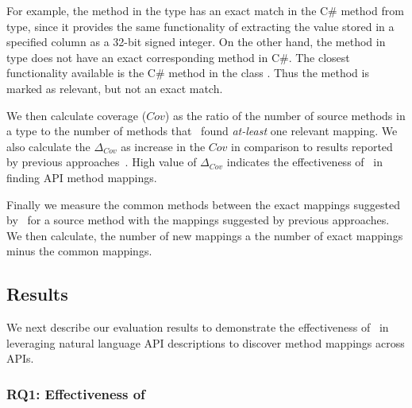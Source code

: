 For example, the method  in the type  has an exact match in the C\# method  from   type, since it provides the same functionality of extracting the value stored in a specified column as a 32-bit signed integer.
On the other hand, the method  in type  does not have an exact corresponding method in C\#. The closest functionality available is the C\# method  in the class . 
Thus the method  is marked as relevant, but not an exact match.


We then calculate coverage ($Cov$) as the ratio of the number of source methods in a type to the number of methods that \tool\ found \textit{at-least} one relevant mapping.
We also calculate the $\Delta_{Cov}$ as increase in the $Cov$ in comparison to results reported by previous approaches~\cite{Gokhale2013ICSE,nguyen2014statistical}. High value of $\Delta_{Cov}$ indicates the effectiveness of \tool\ in finding API method mappings.

Finally we measure the common methods between the exact mappings suggested by \tool\ for a source method with the mappings suggested by previous approaches.
We then calculate, the number of new mappings a the number of exact mappings minus the common mappings.

\subsection {Results}

We next describe our evaluation results to demonstrate the effectiveness of \tool\ in leveraging natural language API descriptions to discover method mappings across APIs.

\subsubsection{RQ1: Effectiveness of \tool\ }

